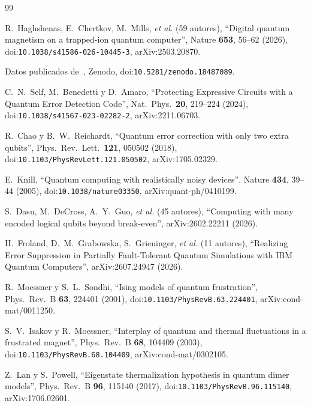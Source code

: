 \documentclass[11pt,a4paper]{article}
\begin{document}
\begin{thebibliography}{99}

 R.~Haghshenas, E.~Chertkov, M.~Mills, \emph{et al.} (59 autores), ``Digital quantum magnetism on a trapped-ion quantum computer'', Nature \textbf{653}, 56--62 (2026), doi:\nolinkurl{10.1038/s41586-026-10445-3}, arXiv:2503.20870.

 Datos publicados de~\cite{haghshenas2026}, Zenodo, doi:\nolinkurl{10.5281/zenodo.18487089}.

 C.~N.~Self, M.~Benedetti y D.~Amaro, ``Protecting Expressive Circuits with a Quantum Error Detection Code'', Nat.\ Phys.\ \textbf{20}, 219--224 (2024), doi:\nolinkurl{10.1038/s41567-023-02282-2}, arXiv:2211.06703.

 R.~Chao y B.~W.~Reichardt, ``Quantum error correction with only two extra qubits'', Phys.\ Rev.\ Lett.\ \textbf{121}, 050502 (2018), doi:\nolinkurl{10.1103/PhysRevLett.121.050502}, arXiv:1705.02329.

 E.~Knill, ``Quantum computing with realistically noisy devices'', Nature \textbf{434}, 39--44 (2005), doi:\nolinkurl{10.1038/nature03350}, arXiv:quant-ph/0410199.

 S.~Dasu, M.~DeCross, A.~Y.~Guo, \emph{et al.} (45 autores), ``Computing with many encoded logical qubits beyond break-even'', arXiv:2602.22211 (2026).

 H.~Froland, D.~M.~Grabowska, S.~Grieninger, \emph{et al.} (11 autores), ``Realizing Error Suppression in Partially Fault-Tolerant Quantum Simulations with IBM Quantum Computers'', arXiv:2607.24947 (2026).

 R.~Moessner y S.~L.~Sondhi, ``Ising models of quantum frustration'', Phys.\ Rev.\ B \textbf{63}, 224401 (2001), doi:\nolinkurl{10.1103/PhysRevB.63.224401}, arXiv:cond-mat/0011250.

 S.~V.~Isakov y R.~Moessner, ``Interplay of quantum and thermal fluctuations in a frustrated magnet'', Phys.\ Rev.\ B \textbf{68}, 104409 (2003), doi:\nolinkurl{10.1103/PhysRevB.68.104409}, arXiv:cond-mat/0302105.

 Z.~Lan y S.~Powell, ``Eigenstate thermalization hypothesis in quantum dimer models'', Phys.\ Rev.\ B \textbf{96}, 115140 (2017), doi:\nolinkurl{10.1103/PhysRevB.96.115140}, arXiv:1706.02601.


\end{thebibliography}
\end{document}
